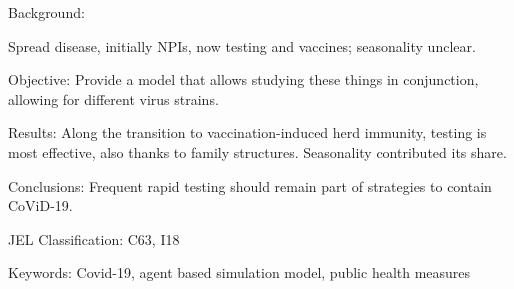 \noindent



Background: 

Spread disease, initially NPIs, now testing and vaccines; seasonality unclear.


Objective: Provide a model that allows studying these things in conjunction, allowing for different virus strains.

Results: Along the transition to vaccination-induced herd immunity, testing is most effective, also thanks to family structures. Seasonality contributed its share.


Conclusions: Frequent rapid testing should remain part of strategies to contain CoViD-19.


\vspace{1cm}
\noindent JEL Classification: C63, I18

\noindent Keywords: Covid-19, agent based simulation model, public health measures

